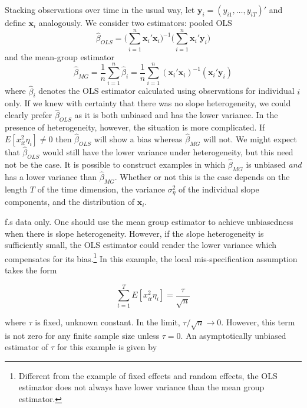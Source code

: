 Stacking observations over time in the usual way, let $\mathbf{y}_i = (y_{i1}, \ldots, y_{iT})'$ and define $\mathbf{x}_i$ analogously. 
We consider two estimators: pooled OLS
	\begin{equation}
\widehat{\beta}_{OLS} = \bigg(\sum_{i=1}^{n} \mathbf{x}_i'  \mathbf{x}_i\bigg)^{-1}\bigg(\sum_{i=1}^{n} \mathbf{x}_i' \mathbf{y}_i   \bigg)	
	\end{equation}
and the mean-group estimator
	\begin{equation}
\widehat{\beta}_{MG}  = \frac{1}{n}\sum_{i=1}^n \widehat{\beta}_i 
= \frac{1}{n} \sum_{i=1}^n \left( \mathbf{x}_i'  \mathbf{x}_i\right)^{-1}\left( \mathbf{x}_i'  \mathbf{y}_i   \right)
\end{equation}
where $\widehat{\beta}_i$ denotes the OLS estimator calculated using observations for individual $i$ only. 
If we knew with certainty that there was no slope heterogeneity, we could clearly prefer $\widehat{\beta}_{OLS}$ as it is both unbiased and has the lower variance.
In the presence of heterogeneity, however, the situation is more complicated.
If $E[x_{it}^2 \eta_i]\neq 0$ then $\widehat{\beta}_{OLS}$ will show a bias whereas $\widehat{\beta}_{MG}$ will not.
We might expect that $\widehat{\beta}_{OLS}$ would still have the lower variance under heterogeneity, but this need not be the case.
It is possible to construct examples in which $\widehat{\beta}_{MG}$ is unbiased \emph{and} has a lower variance than $\widehat{\beta}_{MG}$.
Whether or not this is the case depends on the length $T$ of the time dimension, the variance $\sigma_{\eta}^2$ of the individual slope components, and the distribution of $\mathbf{x}_i$.



f.s data only. One should use the mean group estimator to achieve unbiasedness when there is slope heterogeneity. However, if the slope heterogeneity is sufficiently small, the OLS estimator could render the lower variance which compensates for its bias.\footnote{Different from the example of fixed effects and random effects, the OLS estimator does not always have lower variance than the mean group estimator.} In this example, the local mis-specification assumption takes the form  

\begin{equation}
\sum_{t=1}^T E[x_{it}^2 \eta_i] = \frac{\tau}{\sqrt{n}}
\end{equation}

where $\tau$ is fixed, unknown constant. In the limit, $\tau/\sqrt{n} \rightarrow 0$. However, this term is not zero for any finite sample size unless $\tau =0$. An asymptotically unbiased estimator of $\tau$ for this example is given by

